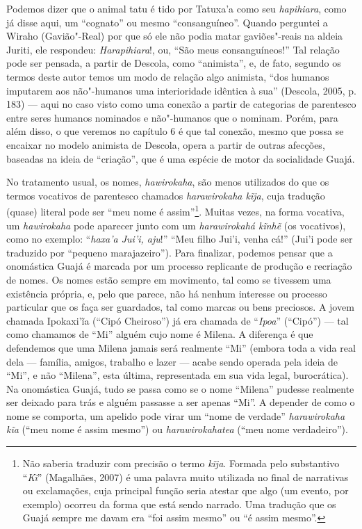 Podemos dizer que o animal tatu é tido por Tatuxa'a como seu
\emph{hapihiara}, como já disse aqui, um ``cognato'' ou mesmo
``consanguíneo''. Quando perguntei a Wiraho (Gavião"-Real) por que só ele
não podia matar gaviões"-reais na aldeia Juriti, ele respondeu:
\emph{Harapihiara}!, ou, ``São meus consanguíneos!'' Tal relação pode
ser pensada, a partir de Descola, como ``animista'', e, de fato, segundo
os termos deste autor temos um modo de relação algo animista, ``dos
humanos imputarem aos não"-humanos uma interioridade idêntica à sua''
(Descola, 2005, p. 183) --- aqui no caso visto como uma conexão a partir de
categorias de parentesco entre seres humanos nominados e não"-humanos que
o nominam. Porém, para além disso, o que veremos no capítulo 6 é que tal
conexão, mesmo que possa se encaixar no modelo animista de Descola,
opera a partir de outras afecções, baseadas na ideia de ``criação'', que
é uma espécie de motor da socialidade Guajá.

No tratamento usual, os nomes, \emph{hawirokaha}, são menos utilizados
do que os termos vocativos de parentesco chamados \emph{harawirokaha
kĩja}, cuja tradução (quase) literal pode ser ``meu nome é
assim''\footnote{Não saberia traduzir com precisão o termo \emph{kĩja}.
  Formada pelo substantivo ``\emph{Kĩ}'' (Magalhães, 2007) é uma palavra
  muito utilizada no final de narrativas ou exclamações, cuja principal
  função seria atestar que algo (um evento, por exemplo) ocorreu da
  forma que está sendo narrado. Uma tradução que os Guajá sempre me
  davam era ``foi assim mesmo'' ou ``é assim mesmo''.}. Muitas vezes, na
forma vocativa, um \emph{hawirokaha} pode aparecer junto com um
\emph{harawirokahá kĩnhẽ} (os vocativos), como no exemplo: ``\emph{haxa'a
Jui'i, aju}!'' ``Meu filho Jui'i, venha cá!'' (Jui'i pode ser traduzido por
``pequeno marajazeiro''). Para finalizar, podemos pensar que a
onomástica Guajá é marcada por um processo replicante de produção e
recriação de nomes. Os nomes estão sempre em movimento, tal como se
tivessem uma existência própria, e, pelo que parece, não há nenhum
interesse ou processo particular que os faça ser guardados, tal como
marcas ou bens preciosos. A jovem chamada Ipokaxi'ĩa (``Cipó Cheiroso'')
já era chamada de ``\emph{Ipoa}'' (``Cipó'') --- tal como chamamos de ``Mi''
alguém cujo nome é Milena. A diferença é que defendemos que uma Milena
jamais será realmente ``Mi'' (embora toda a vida real dela --- família,
amigos, trabalho e lazer --- acabe sendo operada pela ideia de ``Mi'', e
não ``Milena'', esta última, representada em sua vida legal,
burocrática). Na onomástica Guajá, tudo se passa como se o nome
``Milena'' pudesse realmente ser deixado para trás e alguém passasse a
ser apenas ``Mi''. A depender de como o nome se comporta, um apelido
pode virar um ``nome de verdade'' \emph{harawirokaha kĩa} (``meu nome é
assim mesmo'') ou \emph{harawirokahatea} (``meu nome verdadeiro'').

